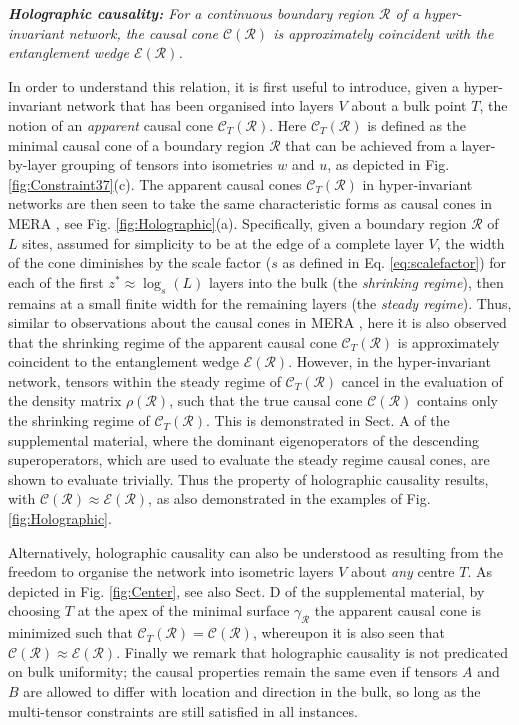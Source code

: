 \documentclass[aps,prl,twocolumn,showpacs,superscriptaddress,floatfix,10pt]{revtex4-1}
\def\E{{\mathcal E}}
\def\C{{\mathcal C}}
\def\R{{\mathcal R}}
\begin{document}
\noindent \textit{\textbf{Holographic causality:} For a continuous boundary region $\R$ of a hyper-invariant network, the causal cone $\C(\R)$ is approximately coincident\textnormal{\cite{approx}} with the entanglement wedge $\E(\R)$.}
\newline

\noindent In order to understand this relation, it is first useful to introduce, given a hyper-invariant network that has been organised into layers $V$ about a bulk point $T$, the notion of an \emph{apparent} causal cone $\C_T(\R)$. Here $\C_T(\R)$ is defined as the minimal causal cone of a boundary region $\R$ that can be achieved from a layer-by-layer grouping of tensors into isometries $w$ and $u$, as depicted in Fig. \ref{fig:Constraint37}(c). The apparent causal cones $\C_T(\R)$ in hyper-invariant networks are then seen to take the same characteristic forms as causal cones in MERA \cite{Vidal08,Evenbly14}, see Fig. \ref{fig:Holographic}(a). Specifically, given a boundary region $\R$ of $L$ sites, assumed for simplicity to be at the edge of a complete layer $V$, the width of the cone diminishes by the scale factor ($s$ as defined in Eq. \ref{eq:scalefactor}) for each of the first $z^*\approx \log_s(L)$ layers into the bulk (the \emph{shrinking regime}), then remains at a small finite width for the remaining layers (the \emph{steady regime}). Thus, similar to observations about the causal cones in MERA \cite{Evenbly14}, here it is also observed that the shrinking regime of the apparent causal cone $\C_T(\R)$ is approximately coincident to the entanglement wedge $\E(\R)$. However, in the hyper-invariant network, tensors within the steady regime of $\C_T(\R)$ cancel in the evaluation of the density matrix $\rho(\R)$, such that the true causal cone $\C(\R)$ contains only the shrinking regime of $\C_T(\R)$. This is demonstrated in Sect. A of the supplemental material, where the dominant eigenoperators of the descending superoperators, which are used to evaluate the steady regime causal cones, are shown to evaluate trivially. Thus the property of holographic causality results, with $\C(\R) \approx \E(\R)$, as also demonstrated in the examples of Fig. \ref{fig:Holographic}.

Alternatively, holographic causality can also be understood as resulting from the freedom to organise the network into isometric layers $V$ about \emph{any} centre $T$. As depicted in Fig. \ref{fig:Center}, see also Sect. D of the supplemental material, by choosing $T$ at the apex of the minimal surface $\gamma_{\R}$ the apparent causal cone is minimized such that $\C_T(\R) = \C(\R)$, whereupon it is also seen that $\C(\R) \approx \E(\R)$. Finally we remark that holographic causality is not predicated on bulk uniformity; the causal properties remain the same even if tensors $A$ and $B$ are allowed to differ with location and direction in the bulk, so long as the multi-tensor constraints are still satisfied in all instances. 
\end{document}
